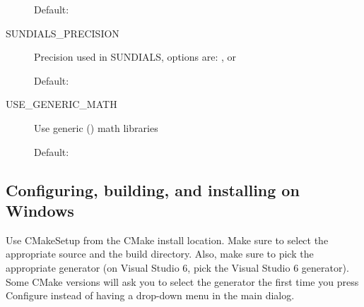 \documentclass[letterpaper,10pt,english]{sphinxmanual}
\begin{document}
\begin{description}
Default: 

\item[{\index{SUNDIALS\_PRECISION (CMake option)}SUNDIALS\_PRECISION}] \leavevmode
Precision used in SUNDIALS, options are: ,  or

Default: 

\item[{\index{USE\_GENERIC\_MATH (CMake option)}USE\_GENERIC\_MATH}] \leavevmode
Use generic () math libraries

Default: 

\end{description}


\subsection{Configuring, building, and installing on Windows}
\label{Install:installation-cmake-windows}\label{Install:configuring-building-and-installing-on-windows}
Use CMakeSetup from the CMake install location. Make sure to
select the appropriate source and the build directory.  Also, make
sure to pick the appropriate generator (on Visual Studio 6, pick the
Visual Studio 6 generator).  Some CMake versions will ask you to
select the generator the first time you press Configure instead of
having a drop-down menu in the main dialog.
\end{document}
